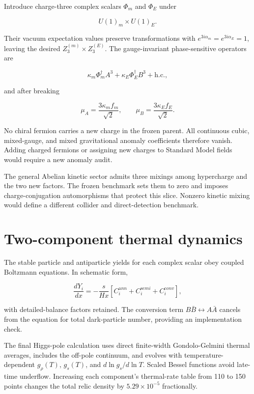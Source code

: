 \documentclass[
]{article}
\begin{document}
Introduce charge-three complex scalars \(\Phi_m\) and \(\Phi_E\) under

\[
U(1)_m\times U(1)_E.
\]

Their vacuum expectation values preserve transformations with
\(e^{3i\alpha_m}=e^{3i\alpha_E}=1\), leaving the desired
\(Z_3^{(m)}\times Z_3^{(E)}\). The gauge-invariant phase-sensitive
operators are

\[
\kappa_m\Phi_m^\dagger A^3+\kappa_E\Phi_E^\dagger B^3+\mathrm{h.c.},
\]

and after breaking

\[
\mu_A=\frac{3\kappa_m f_m}{\sqrt2},\qquad
\mu_B=\frac{3\kappa_E f_E}{\sqrt2}.
\]

No chiral fermion carries a new charge in the frozen parent. All
continuous cubic, mixed-gauge, and mixed gravitational anomaly
coefficients therefore vanish. Adding charged fermions or assigning new
charges to Standard Model fields would require a new anomaly audit.

The general Abelian kinetic sector admits three mixings among
hypercharge and the two new factors. The frozen benchmark sets them to
zero and imposes charge-conjugation automorphisms that protect this
slice. Nonzero kinetic mixing would define a different collider and
direct-detection benchmark.

\hypertarget{two-component-thermal-dynamics}{%
\section{Two-component thermal
dynamics}\label{two-component-thermal-dynamics}}

The stable particle and antiparticle yields for each complex scalar obey
coupled Boltzmann equations. In schematic form,

\[
\frac{dY_i}{dx}=-\frac{s}{Hx}
\left[C_i^{\mathrm ann}+C_i^{\mathrm semi}+C_i^{\mathrm conv}\right],
\]

with detailed-balance factors retained. The conversion term
\(B\bar B\leftrightarrow A\bar A\) cancels from the equation for total
dark-particle number, providing an implementation check.

The final Higgs-pole calculation uses direct finite-width
Gondolo-Gelmini thermal averages, includes the off-pole continuum, and
evolves with temperature-dependent \(g_\rho(T)\), \(g_s(T)\), and
\(d\ln g_s/d\ln T\). Scaled Bessel functions avoid late-time underflow.
Increasing each component's thermal-rate table from 110 to 150 points
changes the total relic density by \(5.29\times10^{-5}\) fractionally.
\end{document}
